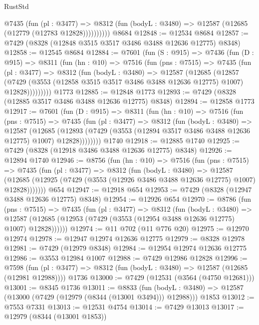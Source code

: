\begin{lexlean}{RustStd}
\begin{coremodule}
            @7435
              (fun (pl : @3477) =>
              @8312 (fun (bodyL : @3480) => @12587 (@12685 (@12779 (@12783 @12828))))))))))
    @8684
@12848 := @12534 @8684
@12857 := @7429 (@8328 (@12848 @3515 @3517 @3486 @3488 @12636 @12775) @8348)
@12858 := @12545 @8684
@12884 := @7601
    (fun (S : @915) =>
    @7436
      (fun (D : @915) =>
      @8311
        (fun (hn : @10) =>
        @7516
          (fun (pns : @7515) =>
          @7435
            (fun (pl : @3477) =>
            @8312
              (fun (bodyL : @3480) =>
              @12587
                (@12685
                  (@12857
                    (@7429
                      (@3553 (@12858 @3515 @3517 @3486 @3488 @12636 @12775) @1007)
                      @12828)))))))))
    @1773
@12885 := @12848 @1773
@12893 := @7429 (@8328 (@12885 @3517 @3486 @3488 @12636 @12775) @8348)
@12894 := @12858 @1773
@12917 := @7601
    (fun (D : @915) =>
    @8311
      (fun (hn : @10) =>
      @7516
        (fun (pns : @7515) =>
        @7435
          (fun (pl : @3477) =>
          @8312
            (fun (bodyL : @3480) =>
            @12587
              (@12685
                (@12893 (@7429 (@3553 (@12894 @3517 @3486 @3488 @12636 @12775) @1007) @12828))))))))
    @1740
@12918 := @12885 @1740
@12925 := @7429 (@8328 (@12918 @3486 @3488 @12636 @12775) @8348)
@12926 := @12894 @1740
@12946 := @8756
    (fun (hn : @10) =>
    @7516
      (fun (pns : @7515) =>
      @7435
        (fun (pl : @3477) =>
        @8312
          (fun (bodyL : @3480) =>
          @12587
            (@12685 (@12925 (@7429 (@3553 (@12926 @3486 @3488 @12636 @12775) @1007) @12828)))))))
    @654
@12947 := @12918 @654
@12953 := @7429 (@8328 (@12947 @3488 @12636 @12775) @8348)
@12954 := @12926 @654
@12970 := @8786
    (fun (pns : @7515) =>
    @7435
      (fun (pl : @3477) =>
      @8312
        (fun (bodyL : @3480) =>
        @12587 (@12685 (@12953 (@7429 (@3553 (@12954 @3488 @12636 @12775) @1007) @12828))))))
@12974 := @11 @702 (@11 @776 @20)
@12975 := @12970 @12974
@12978 := @12947 @12974 @12636 @12775
@12979 := @8328 @12978
@12981 := @7429 (@12979 @8348)
@12984 := @12954 @12974 @12636 @12775
@12986 := @3553 @12984 @1007
@12988 := @7429 @12986 @12828
@12996 := @7598
    (fun (pl : @3477) => @8312 (fun (bodyL : @3480) => @12587 (@12685 (@12981 @12988))))
    @1736
@13000 := @7429 (@12531 (@3564 (@4750 @12681)))
@13001 := @8345 @1736
@13011 := @8833
    (fun (bodyL : @3480) => @12587 (@13000 (@7429 (@12979 (@8344 (@13001 @3494))) @12988)))
    @1853
@13012 := @7553 @7331
@13013 := @12531 @4754
@13014 := @7429 @13013
@13017 := @12979 (@8344 (@13001 @1853))

\end{coremodule}
\end{lexlean}
